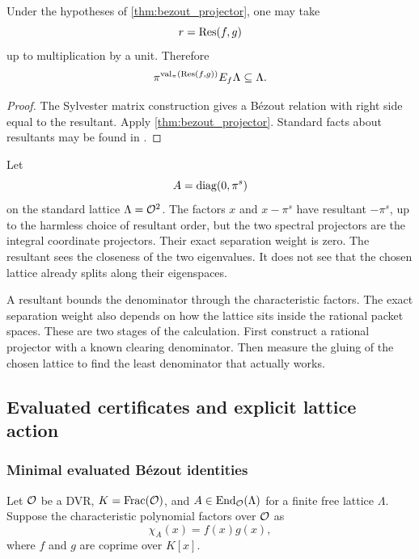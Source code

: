 \begin{corollary}\label{cor:resultant_bound}
Under the hypotheses of \cref{thm:bezout_projector}, one may take
\[
r=\operatorname{Res}(f,g)
\]
up to multiplication by a unit.  Therefore
\[
\pi^{\operatorname{val}_\pi(\operatorname{Res}(f,g))}E_f\Lambda\subseteq\Lambda.
\]
\end{corollary}

\begin{proof}
The Sylvester matrix construction gives a Bézout relation with right side equal to the resultant.  Apply \cref{thm:bezout_projector}.  Standard facts about resultants may be found in \cite{Lang2002,GohbergLancasterRodman2009}.
\end{proof}

\begin{example}\label{ex:loose_resultant}
Let
\[
A=\operatorname{diag}(0,\pi^s)
\]
on the standard lattice $\Lambda={\mathcal O}^2$.  The factors $x$ and $x-\pi^s$ have resultant $-\pi^s$, up to the harmless choice of resultant order, but the two spectral projectors are the integral coordinate projectors.  Their exact separation weight is zero.  The resultant sees the closeness of the two eigenvalues.  It does not see that the chosen lattice already splits along their eigenspaces.
\end{example}

\begin{interpretation}
A resultant bounds the denominator through the characteristic factors. The exact separation weight also depends on how the lattice sits inside the rational packet spaces. These are two stages of the calculation. First construct a rational projector with a known clearing denominator. Then measure the gluing of the chosen lattice to find the least denominator that actually works.
\end{interpretation}

\subsection{Evaluated certificates and explicit lattice action}

\subsubsection{Minimal evaluated B\'ezout identities}

Let ${\mathcal O}$ be a DVR, $K=\operatorname{Frac}({\mathcal O})$, and $A\in\operatorname{End}_{\mathcal O}(\Lambda)$ for a finite free lattice $\Lambda$. Suppose the characteristic polynomial factors over ${\mathcal O}$ as
\[
\chi_A(x)=f(x)g(x),
\]
where $f$ and $g$ are coprime over $K[x]$.

